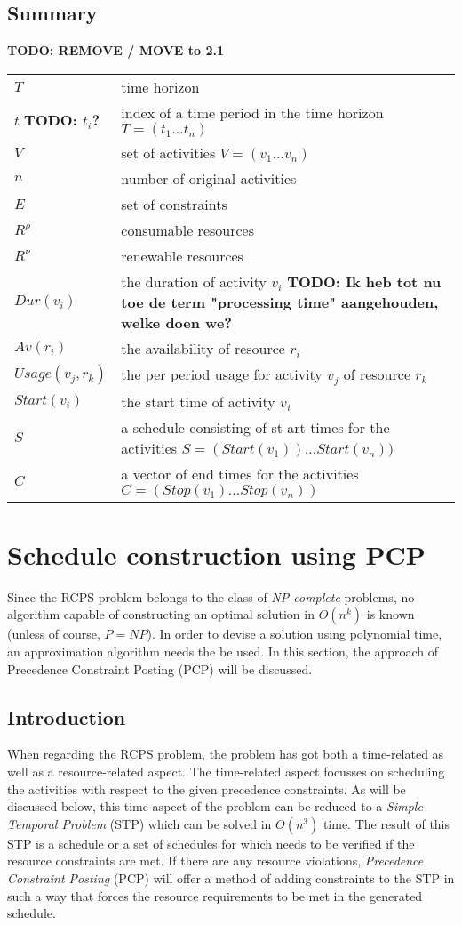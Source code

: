 \documentclass{article}
\newcommand{\TODO}[1]{{\color{red}\textbf{TODO: #1}}}
\newcommand{\renres}[0]{R^\rho} %
\newcommand{\conres}[0]{R^\nu} %
\newcommand{\av}[1]{\textit{Av}(#1)} %
\newcommand{\dur}[1]{\textit{Dur}(#1)} %
\newcommand{\usage}[1]{\textit{Usage}(#1)} %
\newcommand{\start}[1]{\textit{Start}(#1)} %
\begin{document}
\subsection{Summary}
\TODO{REMOVE / MOVE to 2.1}
\begin{tabular}{l l}
\hline
$T$ & time horizon \\
$t$ \TODO{$t_i$?} &  index of a time period in the time horizon $T = (t_1 \ldots t_n)$\\
$V$ & set of activities $V = (v_1 \ldots v_n)$ \\
$n$ & number of original activities \\
$E$ & set of constraints \\
$\renres$ & consumable resources \\
$\conres$ & renewable resources \\
$\dur{v_i}$ & the duration of activity $v_i$ \TODO{Ik heb tot nu toe de term "processing time" aangehouden, welke doen we?}\\
$\av{r_i}$ & the availability of resource $r_i$ \\
$\usage{v_j, r_k}$ & the per period usage for activity $v_j$ of resource $r_k$ \\
$\start{v_i}$ & the start time of activity $v_i$ \\
$S$ & a schedule consisting of st
art times for the activities $S = (\start{v_1}) \ldots \start{v_n})$ \\
$C$ & a vector of end times for the activities $C = (Stop(v_1) \ldots Stop(v_n))$ \\
\hline
\end{tabular}

\newpage

\section{Schedule construction using PCP}
\label{section:PCP}
Since the RCPS problem belongs to the class of \emph{NP-complete} problems, no algorithm capable of constructing an optimal solution in $O(n^k)$ is known (unless of course, $P=NP$). In order to devise a solution using polynomial time, an approximation algorithm needs the be used. In this section, the approach of Precedence Constraint Posting (PCP) will be discussed.

\subsection{Introduction}
When regarding the RCPS problem, the problem has got both a time-related as well as a resource-related aspect. 
The time-related aspect focusses on scheduling the activities with respect to the given precedence constraints. 
As will be discussed below, this time-aspect of the problem can be reduced to a \emph{Simple Temporal Problem} (STP) \cite{lombardi10} which can be solved in $O(n^3)$ time. 
The result of this STP is a schedule or a set of schedules for which needs to be verified if the resource constraints are met. 
If there are any resource violations, \emph{Precedence Constraint Posting} (PCP) will offer a method of adding constraints to the STP in such a way that forces the resource requirements to be met in the generated schedule. 
\end{document}
